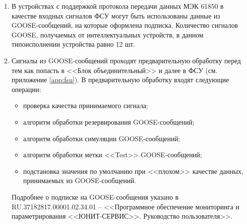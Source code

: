 \documentclass[a4paper, 12pt,table, hidelinks, DIV=calc]{extarticle} %
\begin{document}
\begin{enumerate}[label=\arabic{section}.\arabic{subsection}.\arabic*, labelsep=4pt, leftmargin=0pt, itemindent=57pt]
\item
В устройствах с поддержкой протокола передачи данных МЭК 61850 в качестве входных сигналов ФСУ могут быть использованы данные из GOOSE-сообщений, на которые оформлена подписка. Количество сигналов GOOSE, получаемых от интеллектуальных устройств, в данном типоисполнении устройства равно 12 шт.
\item
Сигналы из GOOSE-сообщений проходят предварительную обработку перед тем как попасть в <<Блок объединительный>> и далее в ФСУ (см. приложение \ref{app:fsu}).
В предварительную обработку входят следующие операции:
\begin{itemize}
\item проверка качества принимаемого сигнала;
\item алгоритм обработки резервирования GOOSE-сообщений;
\item алгоритм обработки симуляции GOOSE-сообщений;
\item алгоритм обработки метки <<Test>> GOOSE-сообщений;
\item подстановка значения по умолчанию при <<плохом>> качестве данных, принимаемых из GOOSE-сообщений.
\end{itemize}
Подробнее о подписке на GOOSE-сообщения указано в RU.37182817.00001.02.34.01 – <<Программное обеспечение мониторинга и параметрирования <<ЮНИТ-СЕРВИС>>. Руководство пользователя>>.


\end{enumerate}
\end{document}

